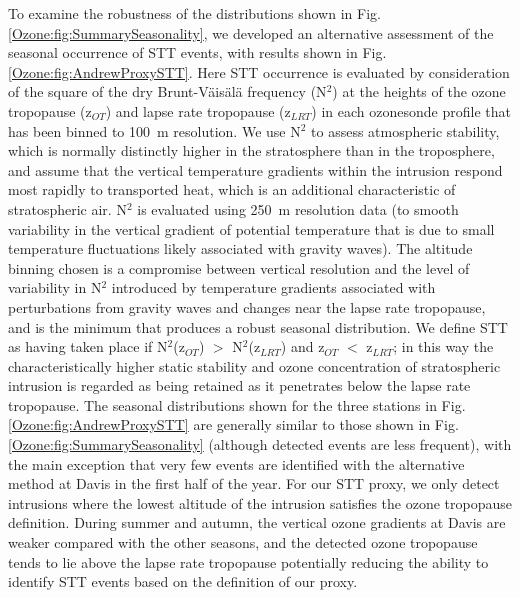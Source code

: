   To examine the robustness of the distributions shown in Fig. \ref{Ozone:fig:SummarySeasonality}, we developed an alternative assessment of the seasonal occurrence of STT events, with results shown in Fig. \ref{Ozone:fig:AndrewProxySTT}.
  Here STT occurrence is evaluated by consideration of the square of the dry Brunt-V\"{a}is\"{a}l\"{a} frequency (N$^2$) at the heights of the ozone tropopause (z$_{OT}$) and lapse rate tropopause (z$_{LRT}$) in each ozonesonde profile that has been binned to 100~m resolution.
  We use N$^2$ to assess atmospheric stability, which is normally distinctly higher in the stratosphere than in the troposphere, and assume that the vertical temperature gradients within the intrusion respond most rapidly to transported heat, which is an additional characteristic of stratospheric air.
  N$^2$ is evaluated using 250~m resolution data (to smooth variability in the vertical gradient of potential temperature that is due to small temperature fluctuations likely associated with gravity waves).
  The altitude binning chosen is a compromise between vertical resolution and the level of variability in N$^2$ introduced by temperature gradients associated with perturbations from gravity waves and changes near the lapse rate tropopause, and is the minimum that produces a robust seasonal distribution.
  We define STT as having taken place if N$^2$(z$_{OT}$) $>$ N$^2$(z$_{LRT}$) and z$_{OT}$ $<$ z$_{LRT}$; in this way the characteristically higher static stability and ozone concentration of stratospheric intrusion is regarded as being retained as it penetrates below the lapse rate tropopause. 
  The seasonal distributions shown for the three stations in Fig. \ref{Ozone:fig:AndrewProxySTT} are generally similar to those shown in Fig. \ref{Ozone:fig:SummarySeasonality} (although detected events are less frequent), with the main exception that very few events are identified with the alternative method at Davis in the first half of the year.
  For our STT proxy, we only detect intrusions where the lowest altitude of the intrusion satisfies the ozone tropopause definition. During summer and autumn, the vertical ozone gradients at Davis are weaker compared with the other seasons, and the detected ozone tropopause tends to lie above the lapse rate tropopause potentially reducing the ability to identify STT events based on the definition of our proxy.
  
